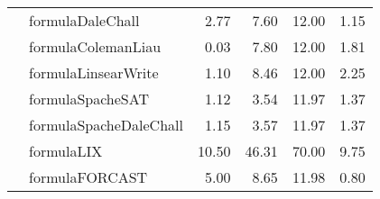 \begin{tabular}{|l|l|r|r|r|r|}
 & formulaDaleChall & 2.77 & 7.60 & 12.00 & 1.15 \\ \cline{2-6}
 & formulaColemanLiau & 0.03 & 7.80 & 12.00 & 1.81 \\ \cline{2-6}
 & formulaLinsearWrite & 1.10 & 8.46 & 12.00 & 2.25 \\ \cline{2-6}
 & formulaSpacheSAT & 1.12 & 3.54 & 11.97 & 1.37 \\ \cline{2-6}
 & formulaSpacheDaleChall & 1.15 & 3.57 & 11.97 & 1.37 \\ \cline{2-6}
 & formulaLIX & 10.50 & 46.31 & 70.00 & 9.75 \\ \cline{2-6}
 & formulaFORCAST & 5.00 & 8.65 & 11.98 & 0.80 \\ \hline
\end{tabular}
